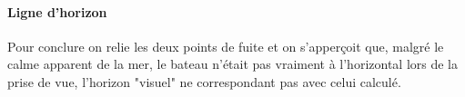 \begin{figure}
\end{figure}

\paragraph{Ligne d'horizon}
Pour conclure on relie les deux points de fuite et on s'apperçoit que, malgré le calme apparent de la mer, le bateau n'était pas vraiment à l'horizontal lors de la prise de vue, l'horizon "visuel" ne correspondant pas avec celui calculé.

